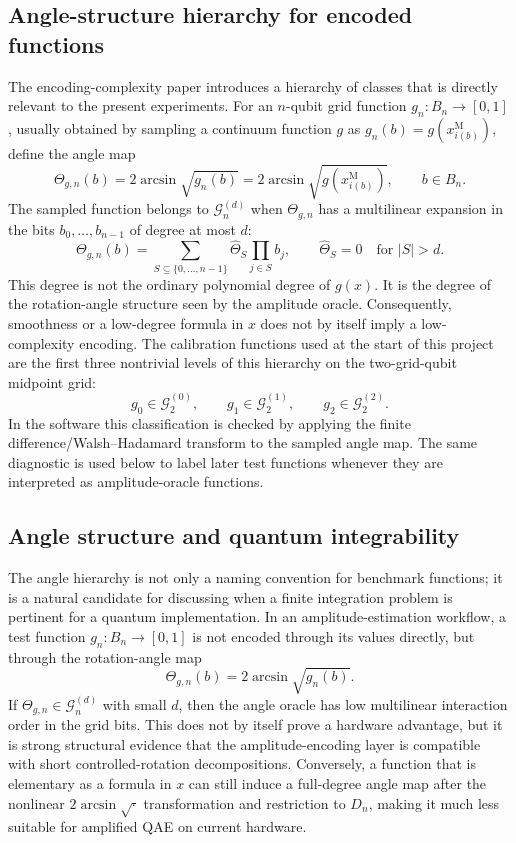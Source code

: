 \subsection{Angle-structure hierarchy for encoded functions}
\label{subsec:angle-structure-hierarchy}

The encoding-complexity paper \cite{chinesta2026encoding} introduces a hierarchy
of classes that is directly relevant to the present experiments. For an
\(n\)-qubit grid function \(g_n:B_n\to[0,1]\), usually obtained by sampling a
continuum function \(g\) as \(g_n(b)=g(x_{i(b)}^{\mathrm{M}})\), define the
angle map
\[
  \Theta_{g,n}(b)
  =
  2\arcsin\sqrt{g_n(b)}
  =
  2\arcsin\sqrt{g(x_{i(b)}^{\mathrm{M}})},
  \qquad b\in B_n .
\]
The sampled function belongs to \(\mathcal{G}^{(d)}_n\) when
\(\Theta_{g,n}\) has a
multilinear expansion in the bits \(b_0,\ldots,b_{n-1}\) of degree at most
\(d\):
\[
  \Theta_{g,n}(b)
  =
  \sum_{S\subseteq\{0,\ldots,n-1\}} \widehat{\Theta}_S
  \prod_{j\in S} b_j,
  \qquad
  \widehat{\Theta}_S=0\quad\text{for } |S|>d .
\]
This degree is not the ordinary polynomial degree of \(g(x)\). It is the degree
of the rotation-angle structure seen by the amplitude oracle. Consequently,
smoothness or a low-degree formula in \(x\) does not by itself imply a
low-complexity encoding. The calibration functions used at the start of this
project are the first three nontrivial levels of this hierarchy on the
two-grid-qubit midpoint grid:
\[
  g_0\in\mathcal{G}^{(0)}_2,\qquad
  g_1\in\mathcal{G}^{(1)}_2,\qquad
  g_2\in\mathcal{G}^{(2)}_2.
\]
In the software this classification is checked by applying the finite
difference/Walsh--Hadamard transform to the sampled angle map. The same
diagnostic is used below to label later test functions whenever they are
interpreted as amplitude-oracle functions.

\subsection{Angle structure and quantum integrability}
\label{subsec:angle-structure-integrability}

The angle hierarchy is not only a naming convention for benchmark functions; it
is a natural candidate for discussing when a finite integration problem is
pertinent for a quantum implementation. In an amplitude-estimation workflow, a
test function \(g_n:B_n\to[0,1]\) is not encoded through its values directly,
but through the rotation-angle map
\[
  \Theta_{g,n}(b)=2\arcsin\sqrt{g_n(b)}.
\]
If \(\Theta_{g,n}\in\mathcal{G}^{(d)}_n\) with small \(d\), then the angle
oracle has low multilinear interaction order in the grid bits. This does not
by itself prove a hardware advantage, but it is strong structural evidence
that the amplitude-encoding layer is compatible with short controlled-rotation
decompositions. Conversely, a function that is elementary as a formula in
\(x\) can still induce a full-degree angle map after the nonlinear
\(2\arcsin\sqrt{\cdot}\) transformation and restriction to \(D_n\), making it
much less suitable for amplified QAE on current hardware.

